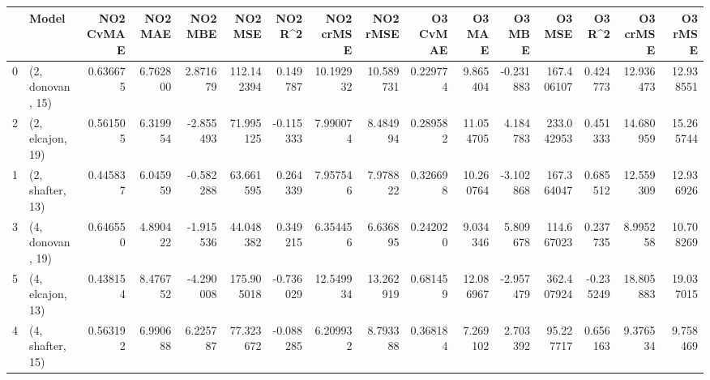 \begin{tabular}{llrrrrrrrrrrrrrr}
\toprule
{} &             Model &  NO2 CvMAE &   NO2 MAE &   NO2 MBE &     NO2 MSE &   NO2 R\textasciicircum2 &  NO2 crMSE &   NO2 rMSE &  O3 CvMAE &     O3 MAE &    O3 MBE &      O3 MSE &    O3 R\textasciicircum2 &   O3 crMSE &    O3 rMSE \\
\midrule
0 &  (2, donovan, 15) &   0.636675 &  6.762800 &  2.871679 &  112.142394 &  0.149787 &  10.192932 &  10.589731 &  0.229774 &   9.865404 & -0.231883 &  167.406107 &  0.424773 &  12.936473 &  12.938551 \\
2 &  (2, elcajon, 19) &   0.561505 &  6.319954 & -2.855493 &   71.995125 & -0.115333 &   7.990074 &   8.484994 &  0.289582 &  11.054705 &  4.184783 &  233.042953 &  0.451333 &  14.680959 &  15.265744 \\
1 &  (2, shafter, 13) &   0.445837 &  6.045959 & -0.582288 &   63.661595 &  0.264339 &   7.957546 &   7.978822 &  0.326698 &  10.260764 & -3.102868 &  167.364047 &  0.685512 &  12.559309 &  12.936926 \\
3 &  (4, donovan, 19) &   0.646550 &  4.890422 & -1.915536 &   44.048382 &  0.349215 &   6.354456 &   6.636895 &  0.242020 &   9.034346 &  5.809678 &  114.667023 &  0.237735 &   8.995258 &  10.708269 \\
5 &  (4, elcajon, 13) &   0.438154 &  8.476752 & -4.290008 &  175.905018 & -0.736029 &  12.549934 &  13.262919 &  0.681459 &  12.086967 & -2.957479 &  362.407924 & -0.235249 &  18.805883 &  19.037015 \\
4 &  (4, shafter, 15) &   0.563192 &  6.990688 &  6.225787 &   77.323672 & -0.088285 &   6.209932 &   8.793388 &  0.368184 &   7.269102 &  2.703392 &   95.227717 &  0.656163 &   9.376534 &   9.758469 \\
\bottomrule
\end{tabular}
